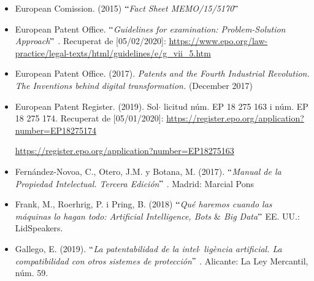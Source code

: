 \documentclass[12pt]{article}
\begin{document}
\begin{itemize}
\vspace{\baselineskip}
	\item European Comission. (2015) $``$\textit{Fact Sheet MEMO/15/5170$"$ }\par


\vspace{\baselineskip}
	\item European Patent Office. \textit{$``$Guidelines for examination: Problem-Solution Approach$"$ . }Recuperat de [05/02/2020]: \href{https://www.epo.org/law-practice/legal-texts/html/guidelines/e/g_vii_5.htm}{https://www.epo.org/law-practice/legal-texts/html/guidelines/e/g\_vii\_5.htm}\par


\vspace{\baselineskip}
	\item European Patent Office. (2017). \textit{Patents and the Fourth Industrial Revolution. The Inventions behind digital transformation. }(December 2017)\par


\vspace{\baselineskip}
	\item European Patent Register. (2019). Sol$ \cdot $ licitud núm. EP 18 275 163 i núm. EP 18 275 174. Recuperat de [05/01/2020]: \href{https://register.epo.org/application?number=EP18275174}{https://register.epo.org/application?number=EP18275174} \par

\href{https://register.epo.org/application?number=EP18275163}{https://register.epo.org/application?number=EP18275163}\par


\vspace{\baselineskip}
	\item Fernández-Novoa, C., Otero, J.M. y Botana, M. (2017). \textit{$``$Manual de la Propiedad Intelectual. Tercera Edición$"$ }. Madrid: Marcial Pons\par


\vspace{\baselineskip}
	\item Frank, M., Roerhrig, P. i Pring, B. (2018) $``$\textit{Qué haremos cuando las máquinas lo hagan todo: Artificial Intelligence, Bots $\&$  Big Data$"$ } EE. UU.: LidSpeakers.\par


\vspace{\baselineskip}
	\item Gallego, E. (2019). $``$\textit{La patentabilidad de la intel$ \cdot $ ligència artificial. La compatibilidad con otros sistemes de protección$"$ }. Alicante: La Ley Mercantil, núm. 59. \par



\end{itemize}
\end{document}

